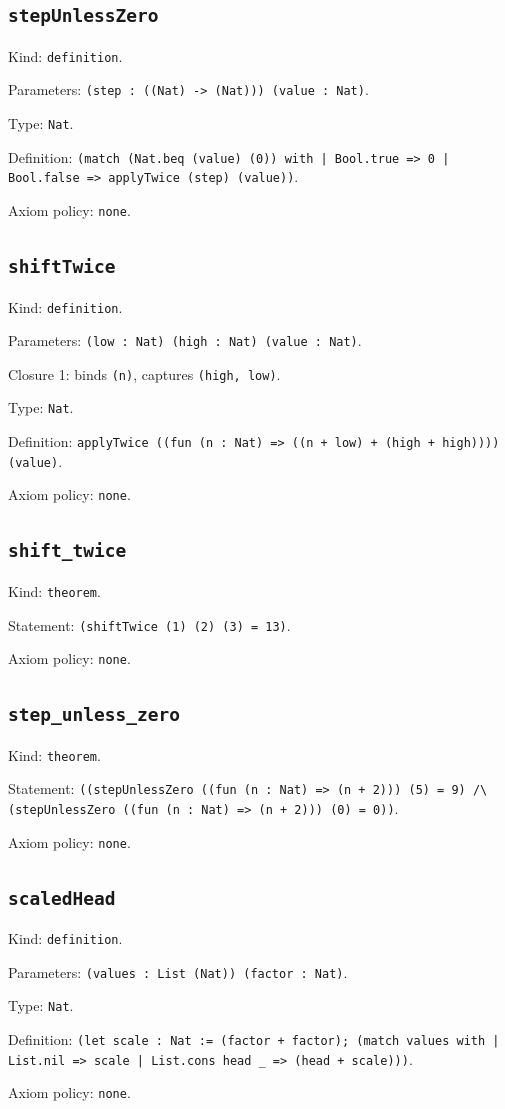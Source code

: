 \documentclass[11pt]{article}
\begin{document}
\subsection*{\texttt{stepUnlessZero}}
\noindent Kind: \texttt{definition}.\par
\noindent Parameters: \texttt{(step : ((Nat) -> (Nat))) (value : Nat)}.\par
\noindent Type: \texttt{Nat}.\par
\noindent Definition: \texttt{(match (Nat.beq (value) (0)) with | Bool.true => 0 | Bool.false => applyTwice (step) (value))}.\par
\noindent Axiom policy: \texttt{none}.\par
\subsection*{\texttt{shiftTwice}}
\noindent Kind: \texttt{definition}.\par
\noindent Parameters: \texttt{(low : Nat) (high : Nat) (value : Nat)}.\par
\noindent Closure 1: binds \texttt{(n)}, captures \texttt{(high, low)}.\par
\noindent Type: \texttt{Nat}.\par
\noindent Definition: \texttt{applyTwice ((fun (n : Nat) => ((n + low) + (high + high)))) (value)}.\par
\noindent Axiom policy: \texttt{none}.\par
\subsection*{\texttt{shift\_twice}}
\noindent Kind: \texttt{theorem}.\par
\noindent Statement: \texttt{(shiftTwice (1) (2) (3) = 13)}.\par
\noindent Axiom policy: \texttt{none}.\par
\subsection*{\texttt{step\_unless\_zero}}
\noindent Kind: \texttt{theorem}.\par
\noindent Statement: \texttt{((stepUnlessZero ((fun (n : Nat) => (n + 2))) (5) = 9) /\textbackslash{} (stepUnlessZero ((fun (n : Nat) => (n + 2))) (0) = 0))}.\par
\noindent Axiom policy: \texttt{none}.\par
\subsection*{\texttt{scaledHead}}
\noindent Kind: \texttt{definition}.\par
\noindent Parameters: \texttt{(values : List (Nat)) (factor : Nat)}.\par
\noindent Type: \texttt{Nat}.\par
\noindent Definition: \texttt{(let scale : Nat := (factor + factor); (match values with | List.nil => scale | List.cons head \_ => (head + scale)))}.\par
\noindent Axiom policy: \texttt{none}.\par
\end{document}
